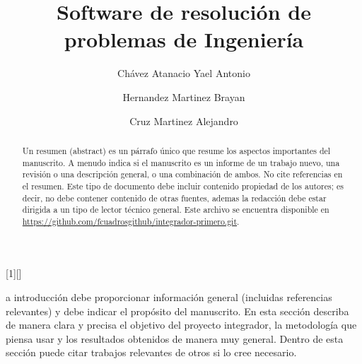 \documentclass{IEEEcsmag}
\begin{document}
[1][]
{}
{}



\title{Software de resolución de problemas de Ingeniería }

\author{Chávez Atanacio Yael Antonio}

\author{Hernandez Martinez Brayan}

\author{Cruz Martinez Alejandro}



\begin{abstract}
Un resumen (abstract) es un párrafo único que resume los aspectos importantes del manuscrito. A menudo indica si el manuscrito es un informe de un trabajo nuevo, una revisión o una descripción general, o una combinación de ambos. No cite referencias en el resumen. Este tipo de documento debe incluir contenido propiedad de los autores; es decir, no debe contener contenido de otras fuentes, ademas la redacción debe  estar dirigida a un tipo de lector técnico general. Este archivo se encuentra disponible en \href{https://github.com/fcuadrosgithub/integrador-primero.git}{https://github.com/fcuadrosgithub/integrador-primero.git}.
\end{abstract}

\maketitle
{}a introducción debe proporcionar información general (incluidas referencias relevantes) y debe indicar el propósito del manuscrito. En esta sección describa de manera clara y precisa el objetivo del proyecto integrador, la metodología que piensa usar y los resultados obtenidos de manera muy general. Dentro de esta sección puede citar trabajos relevantes de otros si lo cree necesario.
\end{document}

